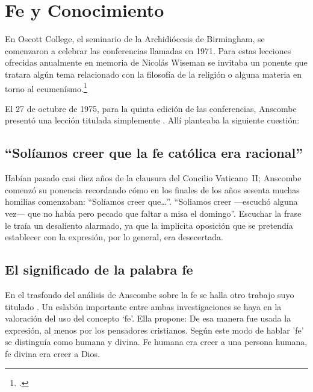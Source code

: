 \section{Fe y Conocimiento}

En Oscott College, el seminario de la Archidiócesis de Birmingham, se comenzaron a celebrar las conferencias llamadas  en 1971. Para estas lecciones ofrecidas anualmente en memoria de Nicolás Wiseman se invitaba un ponente que tratara algún tema relacionado con la filosofía de la religión o alguna materia en torno al ecumenísmo.\footcite[cf.~][p.~7]{wisemanlects}

El 27 de octubre de 1975, para la quinta edición de las conferencias, Anscombe presentó una lección titulada simplemente . Allí planteaba la siguiente cuestión:

\subsection{``Solíamos creer que la fe católica era racional''}
Habían pasado casi diez años de la clausura del Concilio \mbox{Vaticano II}; Anscombe comenzó su ponencia recordando cómo en los finales de los años sesenta muchas homilias comenzaban: ``Solíamos creer que\ldots''. ``Soliamos creer ---escuchó alguna vez--- que no había pero pecado que faltar a misa el domingo''. Escuchar la frase le traía un desaliento alarmado, ya que la implicita oposición que se pretendía establecer con la expresión, por lo general, era desecertada.

\subsection{El significado de la palabra fe}

En el trasfondo del análisis de Anscombe sobre la fe se halla otro trabajo suyo titulado . 
Un eslabón importante entre ambas investigaciones se haya en la valoración del uso del concepto `fe'. 
Ella propone: 
 De esa manera fue usada la expresión, al menos por los pensadores cristianos. 
Según este modo de hablar 'fe' se distinguía como humana y divina. Fe humana era creer a una persona humana, fe divina era creer a Dios.

